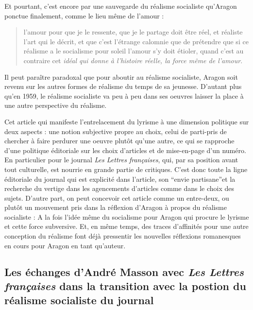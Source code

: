 	Et pourtant, c’est encore par une sauvegarde du réalisme socialiste qu’Aragon ponctue finalement, comme le lieu même de l’amour : 
\begin{quote}
  l’amour pour que je le ressente, que je le partage doit  être réel, et réaliste l’art qui le décrit, et que c’est l’étrange calomnie que de prétendre que si ce réalisme a le socialisme pour soleil l’amour s’y doit étioler, quand c’est au contraire cet \emph{idéal qui donne à l’histoire réelle, la force même de l’amour}.   
\end{quote}


Il peut paraître paradoxal que pour aboutir au réalisme socialiste, Aragon soit revenu sur les autres formes de réalisme du temps de sa jeunesse. D’autant plus qu’en 1959, le réalisme socialiste va peu à peu dans ses oeuvres laisser la place à une autre perspective du réalisme. 

	Cet article qui manifeste l’entrelacement du lyrisme à une dimension politique sur deux aspects : une notion subjective propre au choix, celui de parti-pris de chercher à faire perdurer une oeuvre plutôt qu’une autre, ce qui se rapproche d’une politique éditoriale sur les choix d’articles et de mise-en-page d’un numéro. En particulier pour le journal \emph{Les Lettres françaises}, qui, par sa position avant tout culturelle, est nourrie en grande partie de critiques. C’est donc toute la ligne éditoriale du journal qui est explicité dans l’article, son \enquote{envie partisane}et la recherche du vertige dans les agencements d’articles comme dans le choix des sujets. D’autre part, on peut concevoir cet article comme un entre-deux, ou plutôt un mouvement pris dans la réflexion d’Aragon à propos du réalisme socialiste :  A la fois l’idée même du socialisme  pour Aragon qui procure le lyrisme et cette force subversive. Et, en même temps, des traces d’affinités pour une autre conception du réalisme font déjà pressentir les nouvelles réflexions romanesques en cours pour Aragon en tant qu’auteur. 

\subsection{Les échanges d'André Masson avec \emph{Les Lettres françaises }dans la transition avec la postion du réalisme socialiste du journal}

